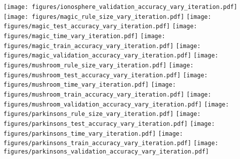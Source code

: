 \begin{figure*}
	\texttt{[image: figures/ionosphere\_validation\_accuracy\_vary\_iteration.pdf]}
	\texttt{[image: figures/magic\_rule\_size\_vary\_iteration.pdf]}
	\texttt{[image: figures/magic\_test\_accuracy\_vary\_iteration.pdf]}
	\texttt{[image: figures/magic\_time\_vary\_iteration.pdf]}
	\texttt{[image: figures/magic\_train\_accuracy\_vary\_iteration.pdf]}
	\texttt{[image: figures/magic\_validation\_accuracy\_vary\_iteration.pdf]}
	\texttt{[image: figures/mushroom\_rule\_size\_vary\_iteration.pdf]}
	\texttt{[image: figures/mushroom\_test\_accuracy\_vary\_iteration.pdf]}
	\texttt{[image: figures/mushroom\_time\_vary\_iteration.pdf]}
	\texttt{[image: figures/mushroom\_train\_accuracy\_vary\_iteration.pdf]}
	\texttt{[image: figures/mushroom\_validation\_accuracy\_vary\_iteration.pdf]}
	\texttt{[image: figures/parkinsons\_rule\_size\_vary\_iteration.pdf]}
	\texttt{[image: figures/parkinsons\_test\_accuracy\_vary\_iteration.pdf]}
	\texttt{[image: figures/parkinsons\_time\_vary\_iteration.pdf]}
	\texttt{[image: figures/parkinsons\_train\_accuracy\_vary\_iteration.pdf]}
	\texttt{[image: figures/parkinsons\_validation\_accuracy\_vary\_iteration.pdf]}
	
	\end{figure*}

